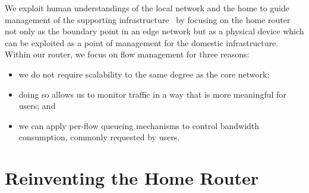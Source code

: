 We exploit human understandings of the local network and the home to guide
management of the supporting
infrastructure~\cite{crabtree03:_findin_place_ubicom_home} by focusing on the
home router not only as the boundary point in an edge network but as a physical
device which can be exploited as a point of management for the domestic
infrastructure.  Within our router, we focus on flow management for three
reasons: \begin{itemize}
    \item we do not require scalability to the same degree as the core network; 
    \item doing so allows us to monitor traffic in a way that is more meaningful
      for users; and 
\item we can apply per-flow queueing mechanisms to control bandwidth
  consumption, commonly requested by users.  \end{itemize}


\section{Reinventing the Home Router} \label{s:router}
 
